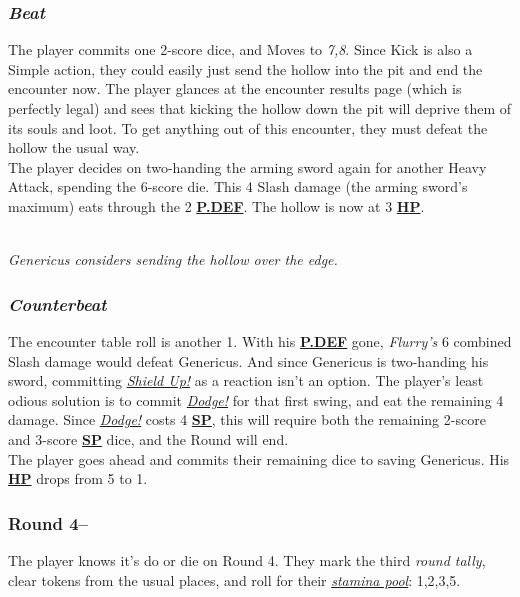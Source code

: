 \documentclass[12pt]{article}
\newcommand{\refto}[1]{\hyperlink{#1}{\textbf{#1}}}
\newcommand{\reftoit}[1]{\hyperlink{#1}{\emph{#1}}}
\begin{document}
\begin{multicols*}{2}
\subsubsection*{\emph{Beat}}
The player commits one 2-score dice, and Moves to \emph{7,8}. Since Kick is also a Simple action, they could easily just send the hollow into the pit and end the encounter now. The player glances at the encounter results page (which is perfectly legal) and sees that kicking the hollow down the pit will deprive them of its souls and loot. To get anything out of this encounter, they must defeat the hollow the usual way.\\
The player decides on two-handing the arming sword again for another Heavy Attack, spending the 6-score die. This 4 Slash damage (the arming sword’s maximum) eats through the 2 \refto{P.DEF}. The hollow is now at 3 \refto{HP}.
\begin{center}
\\
\emph{Genericus considers sending the hollow over the edge.}
\end{center}
\subsubsection*{\emph{Counterbeat}}
The encounter table roll is another 1. With his \refto{P.DEF} gone, \emph{Flurry’s} 6 combined Slash damage would defeat Genericus. And since Genericus is two-handing his sword, committing \reftoit{Shield Up!} as a reaction isn’t an option. The player’s least odious solution is to commit \reftoit{Dodge!} for that first swing, and eat the remaining 4 damage. Since \reftoit{Dodge!} costs 4 \refto{SP}, this will require both the remaining 2-score and 3-score \refto{SP} dice, and the Round will end.\\
The player goes ahead and commits their remaining dice to saving Genericus. His \refto{HP} drops from 5 to 1.

\subsubsection*{Round 4--}
The player knows it’s do or die on Round 4. They mark the third \emph{round tally}, clear tokens from the usual places, and roll for their \reftoit{stamina pool}: 1,2,3,5.

\end{multicols*}
\end{document}

